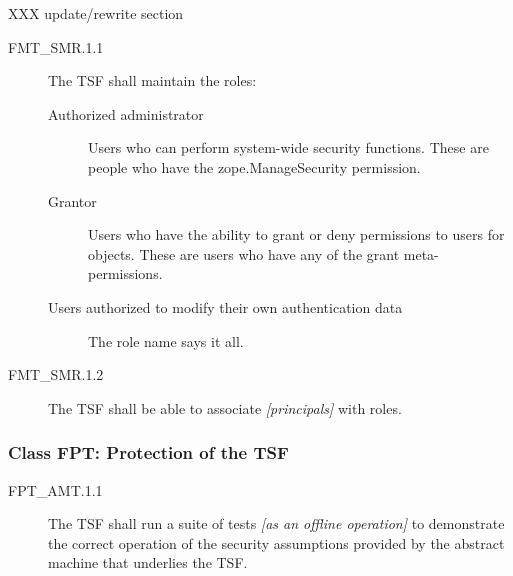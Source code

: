 \documentclass[12pt,english]{scrbook}
\begin{document}
XXX update/rewrite section
\begin{description}
\item[FMT{\_}SMR.1.1]

The TSF shall maintain the roles:
\begin{description}
\item[Authorized administrator]

Users who can perform system-wide security functions. These are
people who have the zope.ManageSecurity permission.

\item[Grantor ]

Users who have the ability to grant or deny permissions to
users for objects.  These are users who have any of the grant
meta-permissions.

\item[Users authorized to modify their own authentication data]

The role name says it all.

\end{description}

\item[FMT{\_}SMR.1.2]

The TSF shall be able to associate \emph{{[}principals]} with roles.

\end{description}





\subsubsection{Class FPT: Protection of the TSF}





\begin{description}
\item[FPT{\_}AMT.1.1 ]

The TSF shall run a suite of tests \emph{{[}as an offline
operation]} to demonstrate the correct operation of the security
assumptions provided by the abstract machine that underlies the
TSF.

\end{description}
\end{document}
